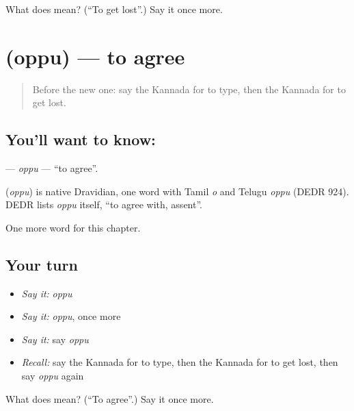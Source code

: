 \begin{tcolorbox}[breakable,colback=teal!4,colframe=teal!35!black,title={Before you move on}]
What does  mean? (\textquotedblleft{}To get lost\textquotedblright{}.) Say it once more.
\end{tcolorbox}
\section[\texorpdfstring{\kn{ಒಪ್ಪು} (oppu)}{ಒಪ್ಪು (oppu)}]{ (oppu) — to agree}

\label{lesson:KA-C238-oppu}



\begin{quote}
Before the new one: say the Kannada for to type, then the Kannada for to get lost.
\end{quote}

\subsection*{You'll want to know: }
\textbf{} — \emph{oppu} — \textquotedblleft{}to agree\textquotedblright{}.

\begin{cousinweb}
\textbf{} (\emph{oppu}) is native Dravidian, one word with Tamil \emph{o} and Telugu \emph{oppu} (DEDR 924). DEDR lists \emph{oppu} itself, \textquotedblleft{}to agree with, assent\textquotedblright{}.
\end{cousinweb}

\begin{grammarlens}[title={What you've built}]
One more word for this chapter.
\end{grammarlens}

\subsection*{Your turn}
\begin{itemize}
\raggedright
  \item \emph{Say it:} \emph{oppu}
  \item \emph{Say it:} \emph{oppu}, once more
  \item \emph{Say it:} say \emph{oppu}
  \item \emph{Recall:} say the Kannada for to type, then the Kannada for to get lost, then say \emph{oppu} again
\end{itemize}

\begin{tcolorbox}[breakable,colback=teal!4,colframe=teal!35!black,title={Before you move on}]
What does  mean? (\textquotedblleft{}To agree\textquotedblright{}.) Say it once more.
\end{tcolorbox}

